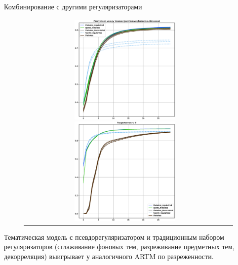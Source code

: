\begin{frame}{Комбинирование с другими регуляризаторами}

\begin{figure}[t]
\setlength\tabcolsep{0pt} %
\begin{tabular}{cc}
\includegraphics[width=54mm]{images/CH4_improved_diversity_jensenshannon_False.eps}
\includegraphics[width=54mm]{images/CH4_improved_SparsityPhiScore.eps}& \end{tabular}
\end{figure}

Тематическая модель с псевдорегуляризатором и традиционным набором регуляризаторов (сглаживание фоновых тем, разреживание предметных тем, декорреляция) выигрывает у аналогичного ARTM по разреженности.

\end{frame}



